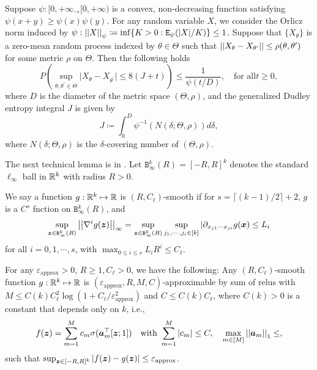 \begin{theorem}\label{thm:generalizd-dudley}
    Suppose $\psi: [0,+\infty_ \rightarrow [0, +\infty)$ is a convex, non-decreasing function satisfying $\psi(x+y) \geq \psi(x) \psi(y)$.
    For any random variable $X$, we consider the Orlicz norm induced by $\psi: \left\lvert \left\lvert X\right\rvert \right\rvert_{\psi} \coloneqq \inf \{ K > 0: \mathtt{E}_\psi(|X|/K) \} \leq 1$.
    Suppose that $\{ X_{\theta} \}$ is a zero-mean random process indexed by $\theta\in\Theta$ such that $\left\lvert \left\lvert X_{\theta} - X_{\theta^\prime} \right\rvert \right\rvert \leq \rho(\theta, \theta^\prime)$ for some metric $\rho$ on $\Theta$.
    Then the following holds
    \[
    P
    \left(
    \sup_{\theta, \theta^\prime \in \Theta}
    \vert 
    X_{\theta}
    -
    X_{\theta^\prime}
    \vert 
    \leq 
    8(J+t)
    \right)
    \leq
    \frac{1}{\psi(t/D)},
    \quad
    \text{for all} t \geq 0,
    \]
    where $D$ is the diameter of the metric space $(\Theta, \rho)$, and the generalized Dudley entropy integral $J$ is given by 
    \[
    J
    \coloneqq
    \int_0^D
    \psi^{-1}
    (N(\delta; \Theta, \rho))
    d \delta,
    \]
    where $N(\delta; \Theta, \rho)$ is the $\delta$-covering number of $(\Theta, \rho)$.
\end{theorem}

The next technical lemma is in \cite{bai2024transformers}.
Let $\mathtt{B}^k_{\infty}(R) = [-R, R]^k$ denotes the standard $\ell_{\infty}$ ball in $\mathbb{R}^k$ with radius $R > 0$. 
\begin{definition}
We say a function $g : \mathbb{R}^k \mapsto \mathbb{R}$ is $(R, C_{\ell})$-smooth if for $s = \lceil (k-1)/2 \rceil + 2$, $g$ is a $C^s$ fnction on $\mathtt{B}_{\infty}^k(R)$, and
\[
\sup_{\bm{z} \in \mathtt{B}_{\infty}^k(R)}
\left\lvert \left\lvert\nabla^i g(\bm{z})\right\rvert \right\rvert_{\infty}
=
\sup_{\bm{z} \in \mathtt{B}_{\infty}^k(R)}
\sup_{j_1,\cdots,j_i\in[k]}
| \partial_{x_{j1} \cdots x_{ji}}
g(\bm{x})
\leq 
L_i
\]
for all $i = 0, 1, \cdots ,s$, with $\max_{0\leq i \leq s} L_i R^i \leq C_{\ell}$.
 
\end{definition}


\begin{lemma}\label{lem:approx}
    For any $\varepsilon_{\text{approx}} > 0$, $R \geq 1, C_{\ell} > 0$, we have the following:
    Any $(R, C_{\ell})$-smooth function $g : \mathbb{R}^k \mapsto \mathbb{R}$ is $(\varepsilon_{\text{approx}}, R, M, C)$-approximable by sum of relus with $M \leq C(k) C_{\ell}^2 \log( 1 + C_{\ell}/\varepsilon_{\text{approx}}^2 )$ and $C \leq C(k) C_{\ell}$, where $C(k) > 0$ is a constant that depends only on $k$, i.e.,
    \[
    f(\bm{z}) =
    \sum_{m=1}^M c_m \sigma( \bm{a}_m^\top [\bm{z} ; 1])
    \quad\text{with }
    \sum_{m=1}^M |c_m| \leq C,
    \quad
    \max_{m\in[M]}
    \left\lvert \left\lvert\bm{a}_m\right\rvert \right\rvert_1 \leq ,    
    \]
    such that $\sup_{\bm{z} \in [-R,R]^k}
    | f(\bm{z}) - g(\bm{z}) |\leq \varepsilon_{\text{approx}}
    $.
\end{lemma}


